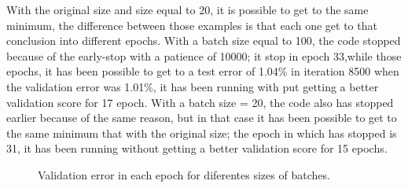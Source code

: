 With the original size and size equal to 20, it is possible to get to the same minimum, the difference between those examples is that each one get to that conclusion into different epochs. With a batch size equal to 100, the code stopped because of the early-stop with a patience of 10000; it stop in epoch 33,while those epochs, it has been possible to get to a test error of 1.04\% in iteration 8500 when the validation error was 1.01\%, it has been running with put getting a better validation score for 17 epoch. With a batch size = 20, the code also has stopped earlier because of the same reason, but in that case it has been possible to get to the same minimum that with the original size; the epoch in which has stopped is 31, it has been running without getting a better validation score for 15 epochs.\\

\begin{figure}[htb]
    \centering

    \caption{Validation error in each epoch for diferentes sizes of batches.} \label{figures:LENET-batches}
\end{figure}

